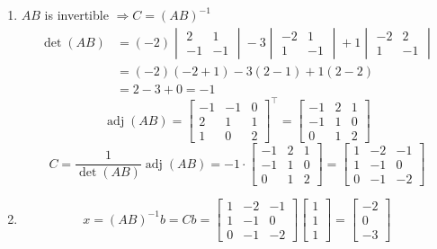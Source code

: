 \documentclass[fleqn]{article}
\begin{document}
\begin{enumerate}[label=(\alph*)]
\item
$AB$ is invertible $\Rightarrow C = (AB)^{-1}$
\begin{align*}
\det(AB) &= (-2)\begin{vmatrix} 2 & 1 \\ -1 & -1 \end{vmatrix}
- 3\begin{vmatrix} -2 & 1 \\ 1 & -1 \end{vmatrix}
+ 1\begin{vmatrix} -2 & 2 \\ 1 & -1 \end{vmatrix} \\
&= (-2)(-2+1) - 3(2-1) + 1(2-2) \\
&= 2 - 3 + 0 = -1
\end{align*}
\[
\operatorname{adj}(AB) = \begin{bmatrix} -1 & -1 & 0 \\ 2 & 1 & 1 \\ 1 & 0 & 2 \end{bmatrix}^\top
= \begin{bmatrix} -1 & 2 & 1 \\ -1 & 1 & 0 \\ 0 & 1 & 2 \end{bmatrix}
\]
\[
C = \frac{1}{\det(AB)} \operatorname{adj}(AB)
= -1 \cdot \begin{bmatrix} -1 & 2 & 1 \\ -1 & 1 & 0 \\ 0 & 1 & 2 \end{bmatrix}
= \begin{bmatrix} 1 & -2 & -1 \\ 1 & -1 & 0 \\ 0 & -1 & -2 \end{bmatrix}
\]

\item
\[
x = (AB)^{-1}b = Cb
= \begin{bmatrix} 1 & -2 & -1 \\ 1 & -1 & 0 \\ 0 & -1 & -2 \end{bmatrix}
\begin{bmatrix} 1 \\ 1 \\ 1 \end{bmatrix}
= \begin{bmatrix} -2 \\ 0 \\ -3 \end{bmatrix}
\]
\end{enumerate}
\end{document}
